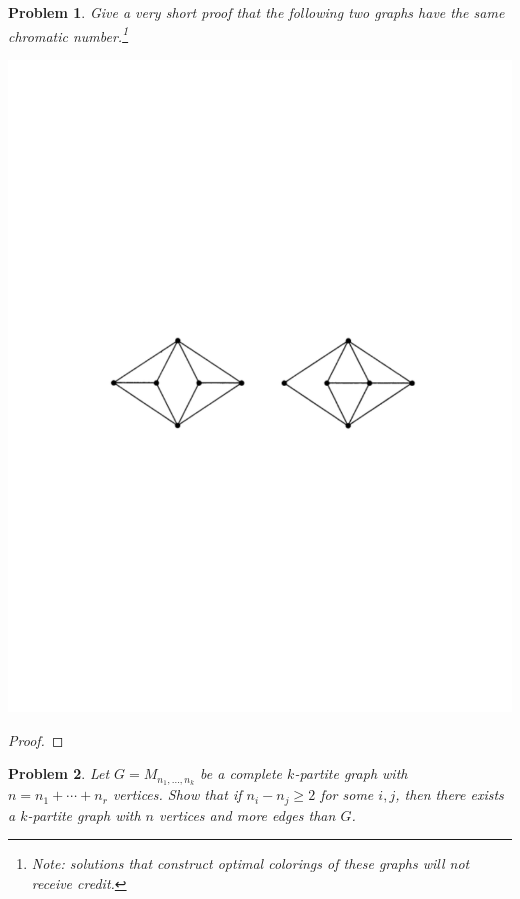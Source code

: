 \documentclass[11pt]{article}
\newtheorem{problem}{Problem}
\begin{document}
\begin{problem}
Give a very short proof that the following two graphs have the same chromatic number.\footnote{Note: solutions that construct optimal colorings of these graphs will not receive credit.}
\begin{center}
\includegraphics[scale=.5]{hw7-graph.pdf}
\end{center}
\end{problem}

\begin{proof}

\end{proof}

\pagebreak


\begin{problem}
Let $G=M_{n_1,\ldots,n_k}$ be a complete $k$-partite graph with $n=n_1+\cdots+n_r$ vertices. Show that if $n_i-n_j\ge2$ for some $i,j$, then there exists a $k$-partite graph with $n$ vertices and more edges than $G$. 
\end{problem}
\end{document}
